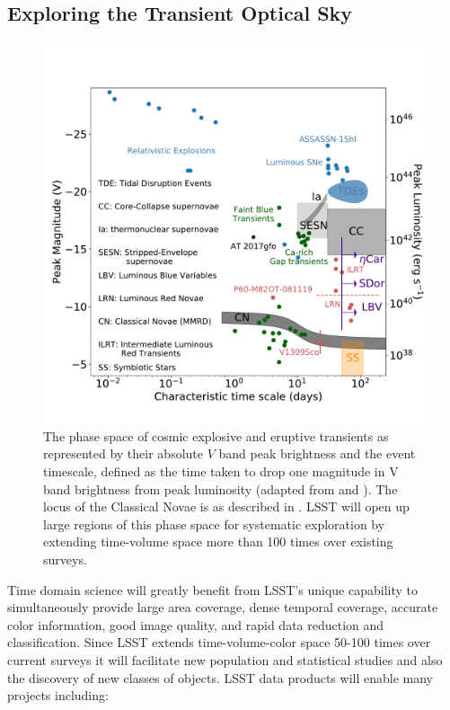 \subsection{ Exploring the Transient Optical Sky }


\begin{figure}
\includegraphics[width=1.0\hsize,clip]{taumv_updated}
\caption{The phase space of cosmic explosive and eruptive transients
  as represented by their absolute $V$ band peak brightness and the
  event timescale, defined as the time taken to drop one magnitude in
  V band brightness from peak luminosity (adapted from \citet{2007Natur.447..458K}
  and \citet{2011PhDT........35K}).  The locus of the Classical
  Novae
is as described in \citet{1995ApJ...452..704D}.  LSST
  will open up large regions of this phase space for systematic
  exploration by extending time-volume space more than 100 times over
  existing surveys.}
\label{Fig:shri}
\end{figure}

Time domain science will greatly benefit from LSST's unique capability
to simultaneously provide large area coverage, dense temporal
coverage, accurate color information, good image quality, and rapid
data reduction and classification. Since LSST extends time-volume-color
space 50-100 times over current surveys \citep[e.g.,][]{2013pss2.book..223D}
it will facilitate new population and statistical studies and also the discovery of new classes of
objects.  LSST data products will enable many projects including:

